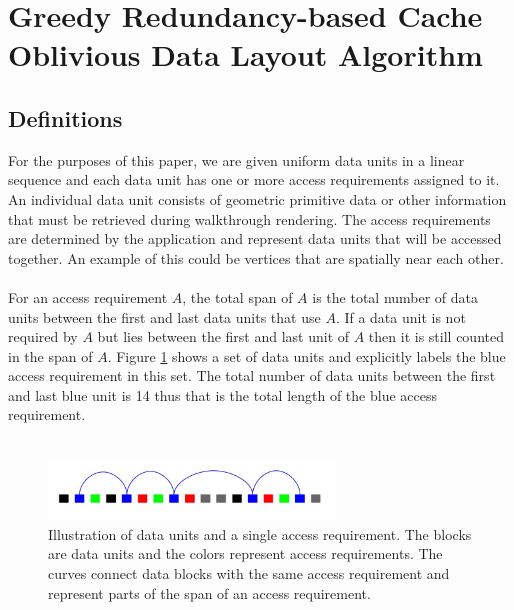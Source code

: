 
\section{Greedy Redundancy-based Cache Oblivious Data Layout Algorithm}

\subsection{Definitions}

For the purposes of this paper, we are given uniform data units in a linear sequence and each data unit has one or more access requirements assigned to it. An individual data unit consists of geometric primitive data or other information that must be retrieved during walkthrough rendering. The access requirements are determined by the application and represent data units that will be accessed together. An example of this could be vertices that are spatially near each other. \\
\\
For an access requirement $A$, the total span of $A$ is the total number of data units between the first and last data units that use $A$. If a data unit is not required by $A$ but lies between the first and last unit of $A$ then it is still counted in the span of $A$. Figure \ref{singleAR} shows a set of data units and explicitly labels the blue access requirement in this set. The total number of data units between the first and last blue unit is 14 thus that is the total length of the blue access requirement.\\
\\
\begin{figure}[ht]
\centering
\includegraphics[width=3in]{SingleAR_start.jpg}
\caption{Illustration of data units and a single access
requirement. The blocks are data units and the colors represent access
requirements. The curves connect data blocks with the same access requirement
and represent parts of the span of an access requirement.}
\label{singleAR}
\end{figure}

